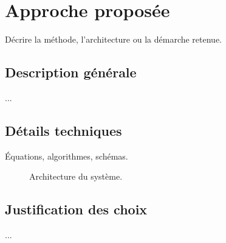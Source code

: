 \chapter{Approche proposée}
\label{chap:approche}

Décrire la méthode, l'architecture ou la démarche retenue.

\section{Description générale}
...

\section{Détails techniques}
Équations, algorithmes, schémas.

\begin{figure}[htbp]
  \centering
  \caption{Architecture du système.}
  \label{fig:architecture}
\end{figure}

\section{Justification des choix}
...